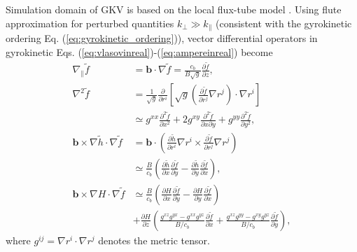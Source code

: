 Simulation domain of GKV is based on the local flux-tube model \cite{Beer1995PoP}. Using flute approximation for perturbed quantities $k_\perp \gg k_\parallel$ (consistent with the gyrokinetic ordering Eq. (\ref{eq:gyrokinetic_ordering})), vector differential operators in gyrokinetic Eqs. (\ref{eq:vlasovinreal})-(\ref{eq:ampereinreal}) become
\begin{align}
  \nabla_\parallel \tilde f &= \bm{b} \cdot \nabla \tilde f = \frac{c_b}{B \sqrt{g}} \frac{\partial \tilde f}{\partial z}, \\
  \nabla^2 \tilde f &= \frac{1}{\sqrt{g}} \frac{\partial}{\partial r^i} \left[ \sqrt{g} \left( \frac{\partial \tilde f}{\partial r^j} \nabla r^j \right) \cdot \nabla r^i \right] \nonumber \\
  &\simeq g^{xx} \frac{\partial^2 \tilde f}{\partial x^2} + 2 g^{xy} \frac{\partial^2 \tilde f}{\partial x \partial y} + g^{yy} \frac{\partial^2 \tilde f}{\partial y^2}, \\
  \bm{b} \times \nabla \tilde h \cdot \nabla \tilde f &= \bm{b} \cdot \left(\frac{\partial \tilde h}{\partial r^i} \nabla r^i \times \frac{\partial \tilde f}{\partial r^j} \nabla r^j \right) \nonumber \\
  &\simeq \frac{B}{c_b} \left( \frac{\partial \tilde h}{\partial x}\frac{\partial \tilde f}{\partial y} - \frac{\partial \tilde h}{\partial y}\frac{\partial \tilde f}{\partial x} \right), \\
  \bm{b} \times \nabla H \cdot \nabla \tilde f &\simeq \frac{B}{c_b} \left( \frac{\partial H}{\partial x}\frac{\partial \tilde f}{\partial y} - \frac{\partial H}{\partial y}\frac{\partial \tilde f}{\partial x} \right) \nonumber \\
  &+ \frac{\partial H}{\partial z} \left( \frac{g^{xz}g^{yx} - g^{xx}g^{yz}}{B/c_b} \frac{\partial \tilde f}{\partial x} + \frac{g^{xz}g^{yy} - g^{xy}g^{yz}}{B/c_b} \frac{\partial \tilde f}{\partial y} \right),
\end{align}
where $g^{ij}=\nabla r^i \cdot \nabla r^j$ denotes the metric tensor.


